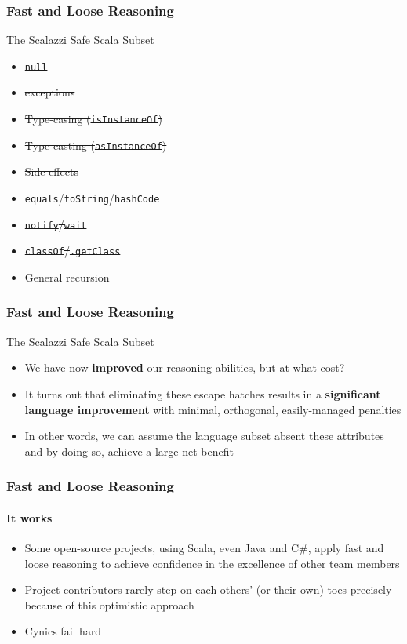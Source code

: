 \begin{frame}[fragile]
\frametitle{Fast and Loose Reasoning}
\begin{block}{The Scalazzi Safe Scala Subset}
\begin{itemize}
  \item \sout{\lstinline{null}}
  \item \sout{exceptions}
  \item \sout{Type-casing (\lstinline{isInstanceOf})}
  \item \sout{Type-casting (\lstinline{asInstanceOf})}
  \item \sout{Side-effects}
  \item \sout{\lstinline{equals}/\lstinline{toString}/\lstinline{hashCode}}
  \item \sout{\lstinline{notify}/\lstinline{wait}}
  \item \sout{\lstinline{classOf}/\lstinline{.getClass}}
  \item General recursion
\end{itemize}
\end{block}
\end{frame}

\begin{frame}[fragile]
\frametitle{Fast and Loose Reasoning}
\begin{block}{The Scalazzi Safe Scala Subset}
\begin{itemize}
  \item<1> We have now \textbf{improved} our reasoning abilities, but at what cost?
  \item<2> It turns out that eliminating these escape hatches results in a \textbf{significant language improvement} with minimal, orthogonal, easily-managed penalties
  \item<3> In other words, we can assume the language subset absent these attributes and by doing so, achieve a large net benefit
\end{itemize}
\end{block}
\end{frame}

\begin{frame}[fragile]
\frametitle{Fast and Loose Reasoning}
\framesubtitle{It works}
\begin{itemize}
  \item<1> Some open-source projects, using Scala, even Java and C\#, apply fast and loose reasoning to achieve confidence in the excellence of other team members
  \item<2> Project contributors rarely step on each others' (or their own) toes precisely because of this optimistic approach
  \item<3> Cynics fail hard
\end{itemize}
\end{frame}

